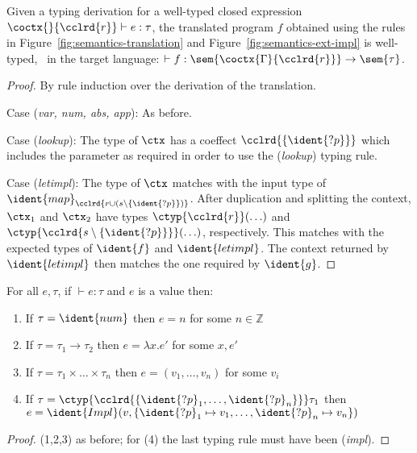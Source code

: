\begin{theorem}
\label{thm:semantics-impl-welltyped}
Given a typing derivation for a well-typed closed expression $\coctx{}{\cclrd{r}} \vdash e : \tau$,
the translated program $f$ obtained using the rules in Figure~\ref{fig:semantics-translation}
and Figure~\ref{fig:semantics-ext-impl} is well-typed, \ie~in the target language: $\vdash f : \sem{\coctx{\Gamma}{\cclrd{r}}} \rightarrow \sem{\tau}$.
\end{theorem}
\begin{proof}
By rule induction over the derivation of the translation.

\vspace{0.5em}\noindent\hangindent=0.6cm
Case (\emph{var, num, abs, app}): As before.

\vspace{0.5em}\noindent\hangindent=0.6cm
Case (\emph{lookup}): The type of $\ctx$ has a coeffect  $\cclrd{ \{\ident{?p}\} }$
  which includes the parameter  as required in order to use the (\emph{lookup}) typing rule.

\vspace{0.5em}\noindent\hangindent=0.6cm
Case (\emph{letimpl}): The type of $\ctx$ matches with the input type of
  $\ident{map}_{  \cclrd{r \cup (s\setminus\{\ident{?p}\})} }$. After duplication and splitting
  the context, $\ctx_1$ and $\ctx_2$ have types $\ctyp{\cclrd{r}}(\ldots)$ and
  $\ctyp{\cclrd{s\setminus\{\ident{?p}\}}}(\ldots)$, respectively. This matches with the expected
  types of $\ident{f}$ and $\ident{letimpl}$. The context returned by $\ident{letimpl}$ then
  matches the one required by $\ident{g}$.
\end{proof}

\begin{lemma}
\label{thm:semantics-impl-canon}
For all $e, \tau$, if $\vdash e : \tau$ and $e$ is a value then:
\begin{enumerate}
  \item If $\tau=\ident{num}$ then $e = n$ for some $n \in \mathbb{Z}$
  \item If $\tau=\tau_1 \rightarrow \tau_2$ then $e = \lambda x.e'$ for some $x, e'$
  \item If $\tau=\tau_1\times\ldots\times\tau_n$ then $e = (v_1, \ldots, v_n)$ for some $v_i$
  \item If $\tau=\ctyp{\cclrd{ \{ \ident{?p}_1, \ldots, \ident{?p}_n \} }}\tau_1$ then $e = \ident{Impl}(v, \{ \ident{?p}_1 \mapsto v_1, \ldots, \ident{?p}_n \mapsto v_n \} )$
\end{enumerate}
\end{lemma}
\begin{proof}
  (1,2,3) as before; for (4) the last typing rule must have been (\emph{impl}).
\end{proof}


